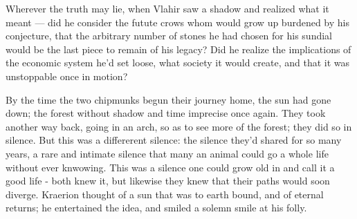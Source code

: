Wherever the truth may lie, when Vlahir saw a shadow and realized what it meant — did he consider the futute crows whom would grow up burdened by his conjecture, that the arbitrary number of stones he had chosen for his sundial would be the last piece to remain of his legacy? 
Did he realize the implications of the economic system he'd set loose, what society it would create, and that it was unstoppable once in motion?



By the time the two chipmunks begun their journey home, the sun had gone down; the forest without shadow and time imprecise once again. They took another way back, going in an arch, so as to see more of the forest; they did so in silence. But this was a differerent silence: the silence they'd shared for so many years, a rare and intimate silence that many an animal could go a whole life without ever knwowing. This was a silence one could grow old in and call it a good life - both knew it, but likewise they knew that their paths would soon diverge. 
Kraerion thought of a sun that was to earth bound, and of eternal returns; he entertained the idea, and smiled a solemn smile at his folly.





